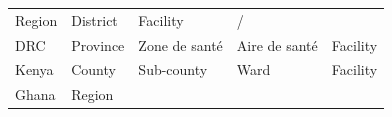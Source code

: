 \documentclass[]{book}
\begin{document}
\begin{longtable}[]{@{}lllll@{}}
\begin{minipage}[t]{0.20\columnwidth}
Region\strut
\end{minipage} & \begin{minipage}[t]{0.20\columnwidth}\raggedright
District\strut
\end{minipage} & \begin{minipage}[t]{0.20\columnwidth}\raggedright
Facility\strut
\end{minipage} & \begin{minipage}[t]{0.20\columnwidth}\raggedright
/\strut
\end{minipage}\tabularnewline
\begin{minipage}[t]{0.07\columnwidth}\raggedright
DRC\strut
\end{minipage} & \begin{minipage}[t]{0.20\columnwidth}\raggedright
Province\strut
\end{minipage} & \begin{minipage}[t]{0.20\columnwidth}\raggedright
Zone de santé\strut
\end{minipage} & \begin{minipage}[t]{0.20\columnwidth}\raggedright
Aire de santé\strut
\end{minipage} & \begin{minipage}[t]{0.20\columnwidth}\raggedright
Facility\strut
\end{minipage}\tabularnewline
\begin{minipage}[t]{0.07\columnwidth}\raggedright
Kenya\strut
\end{minipage} & \begin{minipage}[t]{0.20\columnwidth}\raggedright
County\strut
\end{minipage} & \begin{minipage}[t]{0.20\columnwidth}\raggedright
Sub-county\strut
\end{minipage} & \begin{minipage}[t]{0.20\columnwidth}\raggedright
Ward\strut
\end{minipage} & \begin{minipage}[t]{0.20\columnwidth}\raggedright
Facility\strut
\end{minipage}\tabularnewline
\begin{minipage}[t]{0.07\columnwidth}\raggedright
Ghana\strut
\end{minipage} & \begin{minipage}[t]{0.20\columnwidth}\raggedright
Region\strut
\end{minipage} & \begin{minipage}[t]{0.20\columnwidth}\raggedright

\end{minipage}
\end{longtable}
\end{document}
